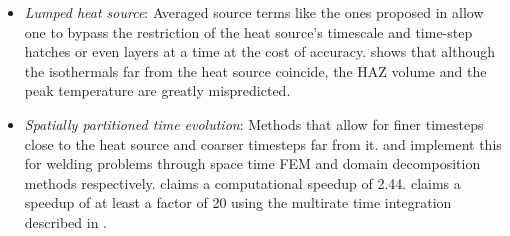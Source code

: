 \begin{itemize}
  \item \textit{Lumped heat source}: Averaged source terms
    like the ones proposed in \cite{Chiumenti2017, Malmelv2019}
    allow one to bypass the restriction of
    the heat source's timescale and time-step hatches
    or even layers at a time at the cost of accuracy.
    \cite{VanElsen2007} shows that although the
    isothermals far from the heat source coincide,
    the HAZ volume and the peak temperature are
    greatly mispredicted.
  \item \textit{Spatially partitioned time evolution}: Methods
    that allow for finer timesteps close to the heat source
    and coarser timesteps far from it. \cite{Kopp2022} and
    \cite{Viguerie2022} implement this for welding problems
    through space time FEM and domain decomposition methods respectively.
    \cite{Viguerie2022} claims a computational speedup of 2.44.
    \cite{Puso2023} claims a speedup of at least a factor of 20
    using the multirate time integration described in \cite{Hodge2021}.
\end{itemize}

